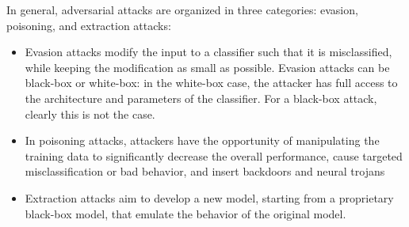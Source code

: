 In general, adversarial attacks are organized in three categories: evasion, poisoning, and extraction attacks:
\begin{itemize}
    \item Evasion attacks modify the input to a classifier such that it is misclassified, while keeping the modification as small as possible. Evasion attacks can be black-box or white-box: in the white-box case, the attacker has full access to the architecture and parameters of the classifier. For a black-box attack, clearly this is not the case.
    \item In poisoning attacks, attackers have the opportunity of manipulating the training data to significantly decrease the overall performance, cause targeted misclassification or bad behavior, and insert backdoors and neural trojans
    \item Extraction attacks aim to develop a new model, starting from a proprietary black-box model, that emulate the behavior of the original model.
\end{itemize}
